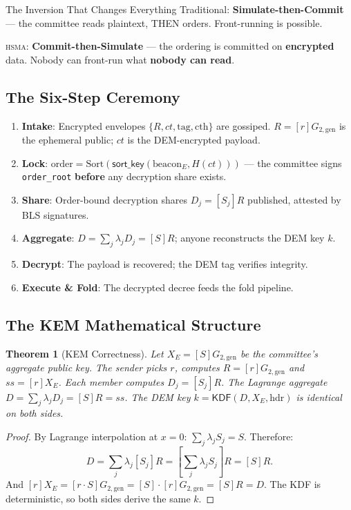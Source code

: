 \documentclass[11pt, a4paper]{article}
\theoremstyle{plain}
\newtheorem{theorem}{Theorem}
\theoremstyle{definition}
\theoremstyle{remark}
\newcommand{\hsma}{\textsc{hsma}}
\begin{document}
\begin{warnbox}{The Inversion That Changes Everything}
Traditional: \textbf{Simulate-then-Commit} --- the committee reads
plaintext, THEN orders. Front-running is possible.

\hsma{}: \textbf{Commit-then-Simulate} --- the ordering is committed
on \textcolor{hsmaRed}{\textbf{encrypted}} data. Nobody can front-run
what \textcolor{hsmaRed}{\textbf{nobody can read}}.
\end{warnbox}

\subsection{The Six-Step Ceremony}

\begin{enumerate}
\item \textbf{Intake}: Encrypted envelopes $\{R, ct, \text{tag},
\text{cth}\}$ are gossiped. $R = [r]G_{2,\mathrm{gen}}$ is the
ephemeral public; $ct$ is the DEM-encrypted payload.
\item \textbf{Lock}: $\text{order} = \text{Sort}(\textsf{sort\_key}(\text{beacon}_E, H(ct)))$ --- the committee signs \texttt{order\_root} \textbf{before} any
decryption share exists.
\item \textbf{Share}: Order-bound decryption shares $D_j = [S_j]R$ published, attested by BLS signatures.
\item \textbf{Aggregate}: $D = \sum_j \lambda_j D_j = [S]R$; anyone
reconstructs the DEM key $k$.
\item \textbf{Decrypt}: The payload is recovered; the DEM tag verifies
integrity.
\item \textbf{Execute \& Fold}: The decrypted decree feeds the fold
pipeline.
\end{enumerate}

\subsection{The KEM Mathematical Structure}

\begin{theorem}[KEM Correctness]
\label{thm:kem}
Let $X_E = [S]G_{2,\mathrm{gen}}$ be the committee's aggregate public
key. The sender picks $r$, computes $R = [r]G_{2,\mathrm{gen}}$ and
 $ss = [r]X_E$. Each member computes $D_j = [S_j]R$. The Lagrange
aggregate $D = \sum_j \lambda_j D_j = [S]R = ss$. The DEM key
 $k = \mathsf{KDF}(D, X_E, \text{hdr})$ is identical on both sides.
\end{theorem}
\begin{proof}
By Lagrange interpolation at $x = 0$: $\sum_j \lambda_j S_j = S$.
Therefore:
\[ D = \sum_j \lambda_j [S_j]R = \left[\sum_j \lambda_j S_j\right]R = [S]R. \]
And $[r]X_E = [r \cdot S]G_{2,\mathrm{gen}} = [S] \cdot [r]G_{2,\mathrm{gen}} = [S]R = D$.
The KDF is deterministic, so both sides derive the same $k$.
\end{proof}
\end{document}
